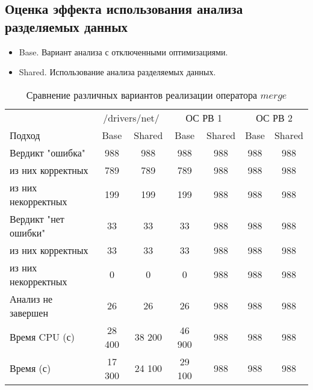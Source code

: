 
\subsection{Оценка эффекта использования анализа разделяемых данных}

\begin{itemize}
\item Base. Вариант анализа с отключенными оптимизациями.
\item Shared. Использование анализа разделяемых данных.
\end{itemize}


\begin{center}
  \begin{table}[h]\footnotesize
  	\label{table-drivers-lock-refinement}
    \caption{Сравнение различных вариантов реализации оператора $merge$}
    \begin{tabular}{ | l | c | c | c | c | c | c |}
      \hline
      		& 		 \multicolumn{2}{|c|}{/drivers/net/} & 		 \multicolumn{2}{|c|}{ОС РВ 1} & 		 \multicolumn{2}{|c|}{ОС РВ 2} \\
      Подход         				& Base 	& Shared 	& Base  & Shared 	& Base   & Shared 	\\ \hline
      Вердикт "ошибка" 				& 988   & 988       & 988   & 988   	& 988    & 988  	\\ 
  \hspace{0.5cm} из них корректных 	& 789 	& 789 		& 789   & 988  		& 988    & 988 		\\ 
  \hspace{0.5cm} из них некорректных & 199 	& 199 		& 199   & 988   	& 988    & 988  	\\ \hline
      Вердикт "нет ошибки"  		& 33    & 33        & 33   	& 988  		& 988    & 988   	\\ 
  \hspace{0.5cm} из них корректных 	& 33 	& 33    	& 33   	& 988   	& 988    & 988  	\\
  \hspace{0.5cm} из них некорректных & 0 	& 0    		& 0    	& 988  		& 988    & 988 		\\ \hline
      Анализ не завершен       		& 26    & 26        & 26   	& 988   	& 988    & 988		\\ \hline
      Время CPU (с)   				& 28 400 & 38 200   & 46 900 & 988   	& 988    & 988		\\ 
      Время (с) 		 			& 17 300 & 24 100   & 29 100 & 988  	& 988    & 988   	\\
      \hline
    \end{tabular}
  \end{table}
\end{center}

